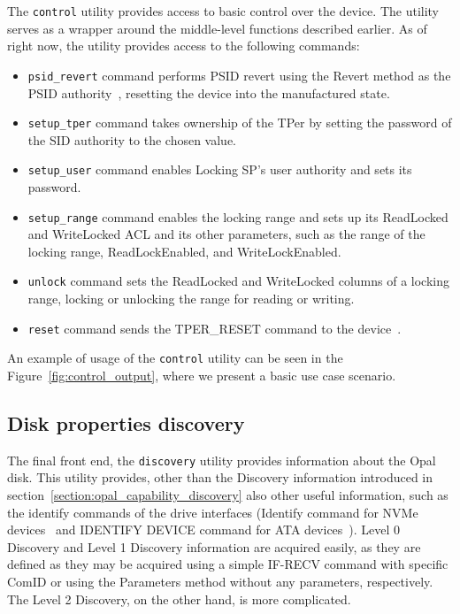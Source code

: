 The \verb|control| utility provides access to basic control over the device.
The utility serves as a wrapper around the middle-level functions described earlier.
As of right now, the utility provides access to the following commands:

\begin{itemize}
    \item \verb|psid_revert| command performs PSID revert using the Revert method as the PSID authority~\cite{tcg-psid}, resetting the device into the manufactured state.
    \item \verb|setup_tper| command takes ownership of the TPer by setting the password of the SID authority to the chosen value.
    \item \verb|setup_user| command enables Locking SP's user authority and sets its password.
    \item \verb|setup_range| command enables the locking range and sets up its ReadLocked and WriteLocked ACL and its other parameters, such as the range of the locking range, ReadLockEnabled, and WriteLockEnabled.
    \item \verb|unlock| command sets the ReadLocked and WriteLocked columns of a locking range, locking or unlocking the range for reading or writing.
    \item \verb|reset| command sends the TPER\_RESET command to the device~\cite{tcg-storage-core}.
\end{itemize}

An example of usage of the \verb|control| utility can be seen in the Figure~\ref{fig:control_output}, where we present a basic use case scenario.

\subsection{Disk properties discovery}
\label{utility_discovery}

The final front end, the \verb|discovery| utility provides information about the Opal disk.
This utility provides, other than the Discovery information introduced in section~\ref{section:opal_capability_discovery} also other useful information, such as the identify commands of the drive interfaces (Identify command for NVMe devices~\cite{nvme-express-base-specification} and IDENTIFY DEVICE command for ATA devices~\cite{acs-3}).
Level 0 Discovery and Level 1 Discovery information are acquired easily, as they are defined as they may be acquired using a simple IF-RECV command with specific ComID %
or using the Parameters method without any parameters, respectively.
The Level 2 Discovery, on the other hand, is more complicated.

